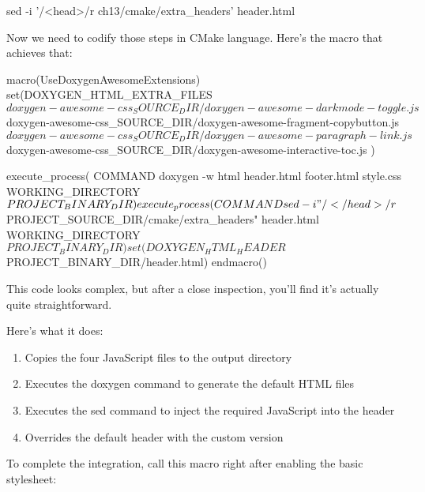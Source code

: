 \begin{shell}
sed -i '/<\/head>/r ch13/cmake/extra_headers' header.html
\end{shell}

Now we need to codify those steps in CMake language. Here’s the macro that achieves that:


\begin{cmake}
macro(UseDoxygenAwesomeExtensions)
    set(DOXYGEN_HTML_EXTRA_FILES
        ${doxygen-awesome-css_SOURCE_DIR}/doxygen-awesome-darkmode-toggle.js
        ${doxygen-awesome-css_SOURCE_DIR}/doxygen-awesome-fragment-copybutton.js
        ${doxygen-awesome-css_SOURCE_DIR}/doxygen-awesome-paragraph-link.js
        ${doxygen-awesome-css_SOURCE_DIR}/doxygen-awesome-interactive-toc.js
    )

    execute_process(
        COMMAND doxygen -w html header.html footer.html style.css
        WORKING_DIRECTORY ${PROJECT_BINARY_DIR}
    )
    execute_process(
        COMMAND sed -i
        "/<\\/head>/r ${PROJECT_SOURCE_DIR}/cmake/extra_headers"
        header.html
        WORKING_DIRECTORY ${PROJECT_BINARY_DIR}
    )
    set(DOXYGEN_HTML_HEADER ${PROJECT_BINARY_DIR}/header.html)
endmacro()
\end{cmake}

This code looks complex, but after a close inspection, you’ll find it’s actually quite straightforward.

Here’s what it does:

\begin{enumerate}
\item
Copies the four JavaScript files to the output directory

\item
Executes the doxygen command to generate the default HTML files

\item
Executes the sed command to inject the required JavaScript into the header

\item
Overrides the default header with the custom version
\end{enumerate}

To complete the integration, call this macro right after enabling the basic stylesheet:


